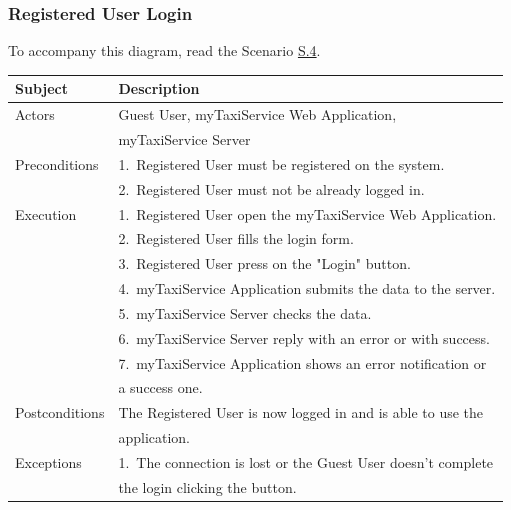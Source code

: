 \subsubsection{Registered User Login}
			To accompany this diagram, read the Scenario \hyperref[sec:RegisteredUserLoginScenario]{S.4}.

				\begin{table}[htpb]
					\centering
					\label{tab:RegisteredUserLoginDiagramTable}
					\begin{tabularx}{\textwidth}{lp{9cm}}
						\hline
						\hline
							\textbf{Subject}
						& 
							\textbf{Description}\\
						\hline
							Actors	       &  Guest User, myTaxiService Web Application, \\
										   &  myTaxiService Server\\
						\hline
							Preconditions  &  1.~Registered User must be registered on the system.\\
							               &  2.~Registered User must not be already logged in.\\
						\hline
							Execution      &  1.~Registered User open the myTaxiService Web Application.\\
										   &  2.~Registered User fills the login form.\\
										   &  3.~Registered User press on the "Login" button.\\
										   &  4.~myTaxiService Application submits the data to the server.\\
										   &  5.~myTaxiService Server checks the data.\\
										   &  6.~myTaxiService Server reply with an error or with success.\\
										   &  7.~myTaxiService Application shows an error notification or\\
										   &     a success one.\\
						\hline
							Postconditions &  The Registered User is now logged in and is able to use the\\
							               &  application.\\
						\hline
							Exceptions     &  1.~The connection is lost or the Guest User doesn't complete\\ 
										   &     the login clicking the button.\\
									
						\hline
						\hline
					\end{tabularx}
				\end{table}


